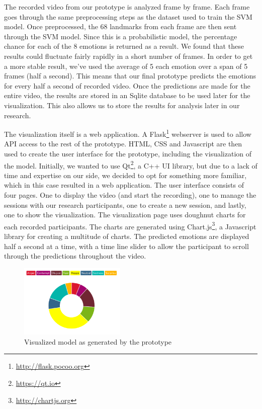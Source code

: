 \documentclass[sigconf]{acmart}
\begin{document}
The recorded video from our prototype is analyzed frame by frame. Each frame goes through the same preprocessing
steps as the dataset used to train the SVM model. Once preprocessed, the 68 landmarks from each frame are then
sent through the SVM model. Since this is a probabilistic model, the percentage chance for each of the 8 emotions
is returned as a result. We found that these results could fluctuate fairly rapidly in a short number of frames.
In order to get a more stable result, we've used the average of 5 each emotion over a span of 5 frames (half a
second). This means that our final prototype predicts the emotions for every half a second of recorded video.
Once the predictions are made for the entire video, the results are stored in an Sqlite database to be used
later for the visualization. This also allows us to store the results for analysis later in our research.

The visualization itself is a web application. A Flask\footnote{\url{http://flask.pocoo.org}} webserver 
is used to allow API access to the rest of the prototype. HTML, CSS and Javascript are then used to 
create the user interface for the prototype, including the visualization of the model.
Initially, we wanted to use Qt\footnote{\url{https://qt.io}}, a C++ UI library, but due to a lack of time and
expertise on our side, we decided to opt for something more familiar, which in this case resulted in a web
application. The user interface consists of four pages. One to display the video (and start the recording),
one to manage the sessions with our research participants, one to create a new session, and lastly, one to
show the visualization. The visualization page uses doughnut charts for each recorded participants. The charts
are generated using Chart.js\footnote{\url{http://chartjs.org}}, a Javascript library for creating a multitude
of charts. The predicted emotions are displayed half a second at a time, with a time line slider to allow the
participant to scroll through the predictions throughout the video.

\begin{figure}[h]
    \centering
    \includegraphics[width=0.45\textwidth, scale=1]{visualization.png}
    \caption{Visualized model as generated by the prototype}
\end{figure}
\end{document}
